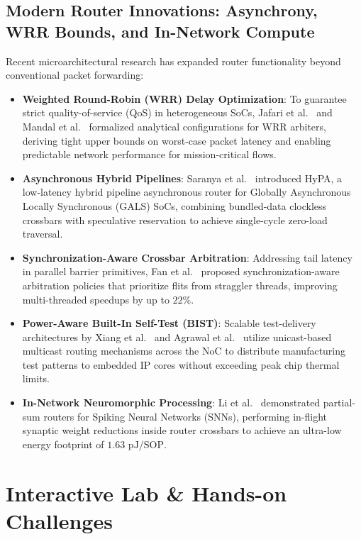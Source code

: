 \subsection{Modern Router Innovations: Asynchrony, WRR Bounds, and In-Network Compute}
\label{sec:ch3_modern_innovations}
Recent microarchitectural research has expanded router functionality beyond conventional packet forwarding:
\begin{itemize}
    \item \textbf{Weighted Round-Robin (WRR) Delay Optimization}: To guarantee strict quality-of-service (QoS) in heterogeneous SoCs, Jafari et al.~\cite{Jafari2016WRR} and Mandal et al.~\cite{Mandal2023WRR} formalized analytical configurations for WRR arbiters, deriving tight upper bounds on worst-case packet latency and enabling predictable network performance for mission-critical flows.
    \item \textbf{Asynchronous Hybrid Pipelines}: Saranya et al.~\cite{Saranya2026HyPA} introduced HyPA, a low-latency hybrid pipeline asynchronous router for Globally Asynchronous Locally Synchronous (GALS) SoCs, combining bundled-data clockless crossbars with speculative reservation to achieve single-cycle zero-load traversal.
    \item \textbf{Synchronization-Aware Crossbar Arbitration}: Addressing tail latency in parallel barrier primitives, Fan et al.~\cite{Fan2024Sync} proposed synchronization-aware arbitration policies that prioritize flits from straggler threads, improving multi-threaded speedups by up to $22\%$.
    \item \textbf{Power-Aware Built-In Self-Test (BIST)}: Scalable test-delivery architectures by Xiang et al.~\cite{Xiang2011Test} and Agrawal et al.~\cite{Agrawal2014Test} utilize unicast-based multicast routing mechanisms across the NoC to distribute manufacturing test patterns to embedded IP cores without exceeding peak chip thermal limits.
    \item \textbf{In-Network Neuromorphic Processing}: Li et al.~\cite{Li2024Neuro} demonstrated partial-sum routers for Spiking Neural Networks (SNNs), performing in-flight synaptic weight reductions inside router crossbars to achieve an ultra-low energy footprint of $1.63\text{ pJ/SOP}$.
\end{itemize}

\section{Interactive Lab \& Hands-on Challenges}
\label{sec:ch3_interactive}

